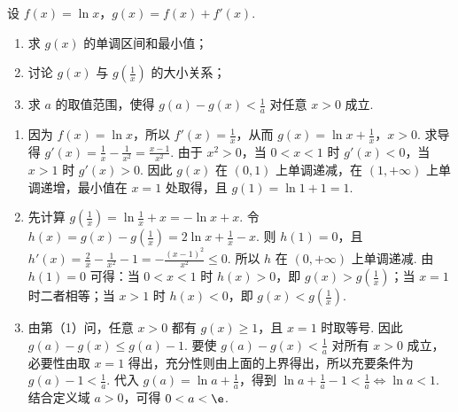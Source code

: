 \begin{problem}
设 \(f(x) = \ln x\)，\(g(x) = f(x) + f'(x)\).

\begin{enumerate}
\item 求 \(g(x)\) 的单调区间和最小值；
\item 讨论 \(g(x)\) 与 \(g\left(\frac{1}{x}\right)\) 的大小关系；
\item 求 \(a\) 的取值范围，使得 \(g(a) - g(x) < \frac{1}{a}\) 对任意 \(x > 0\) 成立.
\end{enumerate}
\end{problem}

\begin{solution}
\begin{enumerate}
\item 因为 \(f(x)=\ln x\)，所以 \(f'(x)=\frac{1}{x}\)，从而 \(g(x)=\ln x+\frac1x\)，\(x>0\). 求导得 \(g'(x)=\frac1x-\frac1{x^2}=\frac{x-1}{x^2}\). 由于 \(x^2>0\)，当 \(0<x<1\) 时 \(g'(x)<0\)，当 \(x>1\) 时 \(g'(x)>0\). 因此 \(g(x)\) 在 \((0,1)\) 上单调递减，在 \((1,+\infty)\) 上单调递增，最小值在 \(x=1\) 处取得，且 \(g(1)=\ln1+1=1\).
\item 先计算 \(g\left(\frac1x\right)=\ln\frac1x+x=-\ln x+x\). 令 \(h(x)=g(x)-g\left(\frac1x\right)=2\ln x+\frac1x-x\). 则 \(h(1)=0\)，且 \(h'(x)=\frac2x-\frac1{x^2}-1=-\frac{(x-1)^2}{x^2}\leqslant0\). 所以 \(h\) 在 \((0,+\infty)\) 上单调递减. 由 \(h(1)=0\) 可得：当 \(0<x<1\) 时 \(h(x)>0\)，即 \(g(x)>g(\frac{1}{x})\)；当 \(x=1\) 时二者相等；当 \(x>1\) 时 \(h(x)<0\)，即 \(g(x)<g(\frac{1}{x})\).
\item 由第（1）问，任意 \(x>0\) 都有 \(g(x)\geqslant1\)，且 \(x=1\) 时取等号. 因此 \(g(a)-g(x)\leqslant g(a)-1\). 要使 \(g(a)-g(x)<\frac{1}{a}\) 对所有 \(x>0\) 成立，必要性由取 \(x=1\) 得出，充分性则由上面的上界得出，所以充要条件为 \(g(a)-1<\frac1a\). 代入 \(g(a)=\ln a+\frac{1}{a}\)，得到 \(\ln a+\frac1a-1<\frac1a\Longleftrightarrow \ln a<1\). 结合定义域 \(a>0\)，可得 \(0<a<\e\).
\end{enumerate}
\end{solution}
